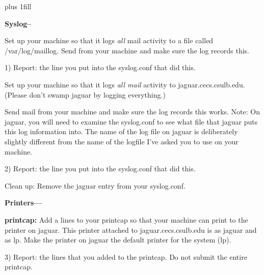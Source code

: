 
\rightskip=0pt plus 1fill

\parindent 0pt

{\bf Syslog--}

Set up your machine so that it logs {\it  all} mail activity to a file
called {\ltt{}/var/log/maillog}.
Send from your machine and make sure the log records this.

1) Report: the line you put into the syslog.conf that did this.

Set up your machine so that it logs {\it all mail} activity to 
{\ltt{}jaguar.cecs.csulb.edu}.
(Please don't swamp jaguar by logging everything.)

Send mail from your machine and make sure the log records this works.
Note: On {\ltt{}jaguar}, you will need to examine the {\ltt{}syslog.conf}
to see what file that {\ltt{}jaguar} puts this log information into.
The name of the log file on jaguar is deliberately slightly different from
the name of the logfile I've asked you to use on your machine.

2) Report: the line you put into the syslog.conf that did this.

Clean up: Remove the {\ltt{}jaguar} entry from your {\ltt{}syslog.conf}.


{\bf Printers---}

{\bf printcap:}
Add a lines to your printcap so that your machine can
print to the printer on jaguar.
This printer attached to {\ltt{}jaguar.cecs.csulb.edu} is
as {\ltt{}jaguar} and as {\ltt{}lp}.
Make the printer on {\ltt{}jaguar} the default printer for the system 
({\ltt{}lp}).

3) Report: the lines that you added to the printcap. 
Do not submit the entire printcap.

\bye
